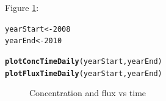 \documentclass[a4paper,11pt]{article}\usepackage{graphicx, color}
\makeatletter
\newcommand{\hlfunctioncall}[1]{\textcolor[rgb]{0.501960784313725,0,0.329411764705882}{\textbf{#1}}}%
\newenvironment{kframe}{%
 \def\at@end@of@kframe{}%
 \ifinner\ifhmode%
  \def\at@end@of@kframe{\end{minipage}}%
  \begin{minipage}{\columnwidth}%
 \fi\fi%
 \def\FrameCommand##1{\hskip\@totalleftmargin \hskip-\fboxsep
 \colorbox{shadecolor}{##1}\hskip-\fboxsep
     \hskip-\linewidth \hskip-\@totalleftmargin \hskip\columnwidth}%
 \MakeFramed {\advance\hsize-\width
   \@totalleftmargin\z@ \linewidth\hsize
   \@setminipage}}%
 {\par\unskip\endMakeFramed%
 \at@end@of@kframe}
\newenvironment{knitrout}{}{} %
\makeatother
\begin{document}
Figure \ref{fig:plotConcTimeDaily}:
\begin{knitrout}
\color{fgcolor}\begin{kframe}
\begin{alltt}
yearStart <- 2008
yearEnd <- 2010

\hlfunctioncall{plotConcTimeDaily}(yearStart, yearEnd)
\hlfunctioncall{plotFluxTimeDaily}(yearStart, yearEnd)
\end{alltt}
\end{kframe}\begin{figure}[]
\caption[Concentration and flux vs time]{Concentration and flux vs time\label{fig:plotConcTimeDaily}}
\end{figure}


\end{knitrout}
\end{document}
